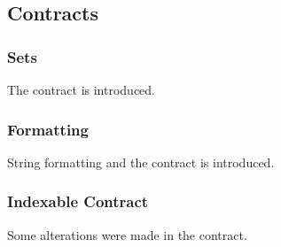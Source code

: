 \subsection{Contracts}
\subsubsection{Sets}
The  contract is introduced.

\subsubsection{Formatting}
String formatting and the  contract is introduced.

\subsubsection{Indexable Contract}
Some alterations were made in the  contract.




